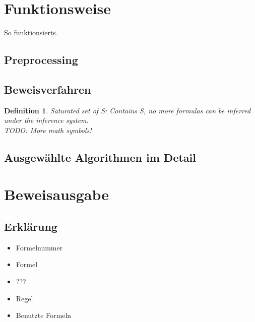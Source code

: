 \documentclass{acm_proc_article-sp-german}
\newtheorem{satset}{Definition}
\begin{document}
\section{Funktionsweise}
\label{sec:mechanics}
So funktionsierts.

\subsection{Preprocessing}
\label{subsec:preprocessing}

\subsection{Beweisverfahren}
\label{subsec:proofmech}

\begin{satset}
	Saturated set of S: Contains S, no more formulas can be inferred under the inference system.\\
	TODO: More math symbols!
\end{satset}

\subsection{Ausgewählte Algorithmen im Detail}
\label{subsec:algos}


\section{Beweisausgabe}
\label{sec:output}


\subsection{Erklärung}
\label{subsec:outputexplained}

\begin{itemize}
\item Formelnummer
\item Formel
\item ???
\item Regel
\item Benutzte Formeln

\end{itemize}
\end{document}
